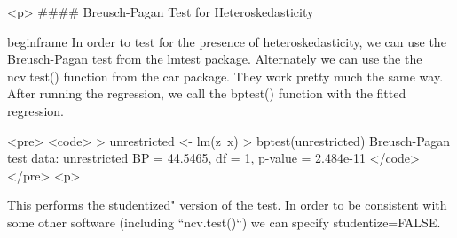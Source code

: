 
<p>
#### {Breusch-Pagan Test for Heteroskedasticity}

begin{frame}
In order to test for the presence of heteroskedasticity, we can use the Breusch-Pagan test from the lmtest
package. Alternately we can use the the ncv.test() function from the car package. They work pretty much
the same way. After running the regression, we call the bptest() function with the fitted regression.


<pre>
<code>
> unrestricted <- lm(z~x)
> bptest(unrestricted)
Breusch-Pagan test
data: unrestricted
BP = 44.5465, df = 1, p-value = 2.484e-11
</code>
</pre>
<p>


This performs the studentized" version of the test. In order to be consistent with some other software
(including ``ncv.test()``) we can specify studentize=FALSE.

